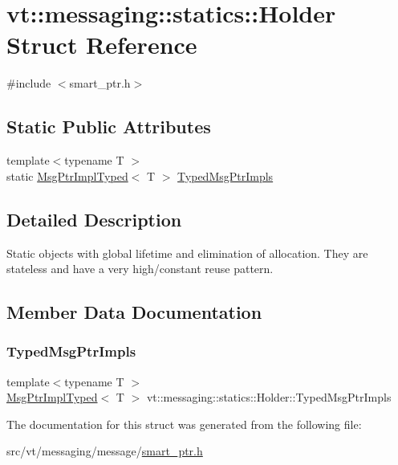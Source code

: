 \hypertarget{structvt_1_1messaging_1_1statics_1_1_holder}{}\section{vt\+:\+:messaging\+:\+:statics\+:\+:Holder Struct Reference}
\label{structvt_1_1messaging_1_1statics_1_1_holder}


{\ttfamily \#include $<$smart\+\_\+ptr.\+h$>$}

\subsection*{Static Public Attributes}
\begin{DoxyCompactItemize}
\item 
{\footnotesize template$<$typename T $>$ }\\static \hyperlink{structvt_1_1messaging_1_1_msg_ptr_impl_typed}{Msg\+Ptr\+Impl\+Typed}$<$ T $>$ \hyperlink{structvt_1_1messaging_1_1statics_1_1_holder_aa2947eaef3eac9d1ad3e25cdf5e75b5b}{Typed\+Msg\+Ptr\+Impls}
\end{DoxyCompactItemize}


\subsection{Detailed Description}
Static objects with global lifetime and elimination of allocation. They are stateless and have a very high/constant reuse pattern. 

\subsection{Member Data Documentation}
\mbox{\label{structvt_1_1messaging_1_1statics_1_1_holder_aa2947eaef3eac9d1ad3e25cdf5e75b5b}} 
\subsubsection{\texorpdfstring{Typed\+Msg\+Ptr\+Impls}{TypedMsgPtrImpls}}
{\footnotesize\ttfamily template$<$typename T $>$ \\
\hyperlink{structvt_1_1messaging_1_1_msg_ptr_impl_typed}{Msg\+Ptr\+Impl\+Typed}$<$ T $>$ vt\+::messaging\+::statics\+::\+Holder\+::\+Typed\+Msg\+Ptr\+Impls\hspace{0.3cm}{\ttfamily [static]}}



The documentation for this struct was generated from the following file\+:\begin{DoxyCompactItemize}
\item 
src/vt/messaging/message/\hyperlink{smart__ptr_8h}{smart\+\_\+ptr.\+h}\end{DoxyCompactItemize}
